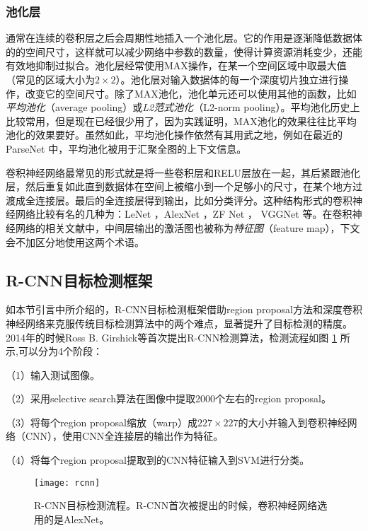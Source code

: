 \subsubsection{池化层}
通常在连续的卷积层之后会周期性地插入一个池化层。它的作用是逐渐降低数据体的的空间尺寸，这样就可以减少网络中参数的数量，使得计算资源消耗变少，还能有效地抑制过拟合。池化层经常使用MAX操作，在某一个空间区域中取最大值（常见的区域大小为$2\times2$）。池化层对输入数据体的每一个深度切片独立进行操作，改变它的空间尺寸。除了MAX池化，池化单元还可以使用其他的函数，比如\emph{平均池化}（average pooling）或\emph{L2范式池化}（L2-norm pooling）。平均池化历史上比较常用，但是现在已经很少用了，因为实践证明，MAX池化的效果往往比平均池化的效果要好。虽然如此，平均池化操作依然有其用武之地，例如在最近的ParseNet \cite{parsenet} 中，平均池化被用于汇聚全图的上下文信息。

卷积神经网络最常见的形式就是将一些卷积层和RELU层放在一起，其后紧跟池化层，然后重复如此直到数据体在空间上被缩小到一个足够小的尺寸，在某个地方过渡成全连接层。最后的全连接层得到输出，比如分类评分。这种结构形式的卷积神经网络比较有名的几种为：LeNet \cite{mnist}，AlexNet \cite{alexnet}，ZF Net \cite{zfnet}， VGGNet \cite{vgg} 等。在卷积神经网络的相关文献中，中间层输出的激活图也被称为\emph{特征图}（feature map），下文会不加区分地使用这两个术语。

\subsection{R-CNN目标检测框架}
如本节引言中所介绍的，R-CNN目标检测框架借助region proposal方法和深度卷积神经网络来克服传统目标检测算法中的两个难点，显著提升了目标检测的精度。2014年的时候Ross B. Girshick等首次提出R-CNN检测算法，检测流程如图 \ref{fig:rcnn} 所示,可以分为4个阶段：
\begin{namelist}{}
	\item （1）输入测试图像。
	\item （2）采用selective search算法在图像中提取2000个左右的region proposal。
	\item （3）将每个region proposal缩放（warp）成$227\times227$的大小并输入到卷积神经网络（CNN），使用CNN全连接层的输出作为特征。
	\item （4）将每个region proposal提取到的CNN特征输入到SVM进行分类。
\end{namelist}

\begin{figure}[h]
	\centering
	\texttt{[image: rcnn]}
	\caption{R-CNN目标检测流程。R-CNN首次被提出的时候，卷积神经网络选用的是AlexNet。}
	\label{fig:rcnn}
\end{figure}

